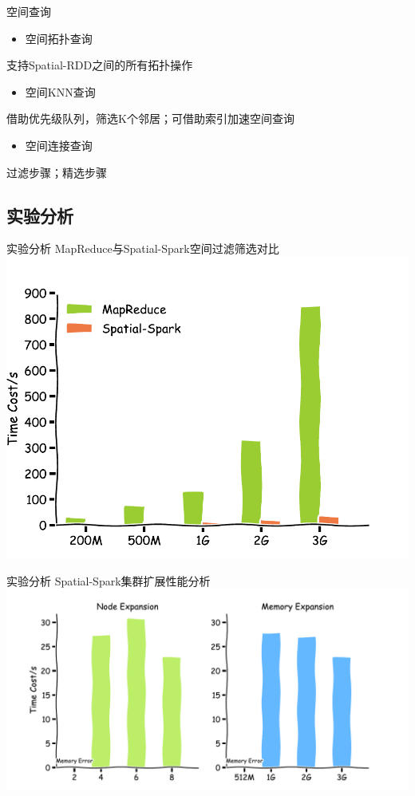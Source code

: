 \begin{frame}[c]{空间查询}
    \begin{itemize}
        \item \alert{空间拓扑查询}
    \end{itemize}
    支持Spatial-RDD之间的所有拓扑操作

    \pause
    \begin{itemize}
        \item \alert{空间KNN查询}
    \end{itemize}
    借助优先级队列，筛选K个邻居；可借助索引加速空间查询

    \pause
    \begin{itemize}
        \item \alert{空间连接查询}
    \end{itemize}
    过滤步骤；精选步骤
\end{frame}
\subsection{实验分析}

\begin{frame}[t]{实验分析}
    MapReduce与Spatial-Spark空间过滤筛选对比
    \vspace{1em}
    \includegraphics[width=0.9 \textwidth]{figures/topo_query.pdf}
\end{frame}

\begin{frame}[t]{实验分析}
    Spatial-Spark集群扩展性能分析
    \vspace{1em}
    \includegraphics[width=0.9 \textwidth]{figures/node_memory.pdf}
\end{frame}

